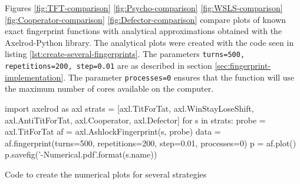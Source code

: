 Figures \ref{fig:TFT-comparison} \ref{fig:Psycho-comparison} \ref{fig:WSLS-comparison} \ref{fig:Cooperator-comparison} \ref{fig:Defector-comparison} compare plots of known exact fingerprint functions with analytical approximations obtained with the Axelrod-Python library.
The analytical plots were created with the code seen in listing \ref{lst:create-several-fingerprints}.
The parameters \texttt{turns=500, repetitions=200, step=0.01} are as described in section \ref{sec:fingerprint-implementation}.
The parameter \texttt{processes=0} ensures that the function will use the maximum number of cores available on the computer.

\begin{listing}[hbtp!]
\begin{ExampleCode}
import axelrod as axl
strats = [axl.TitForTat, axl.WinStayLoseShift, axl.AntiTitForTat,
          axl.Cooperator, axl.Defector]
for s in strats:
    probe = axl.TitForTat
    af = axl.AshlockFingerprint(s, probe)
    data = af.fingerprint(turns=500, repetitions=200, step=0.01, processes=0)
    p = af.plot()
    p.savefig('{}-Numerical.pdf'.format(s.name))
\end{ExampleCode}
\caption{Code to create the numerical plots for several strategies}
\label{lst:create-several-fingerprints}
\end{listing}

